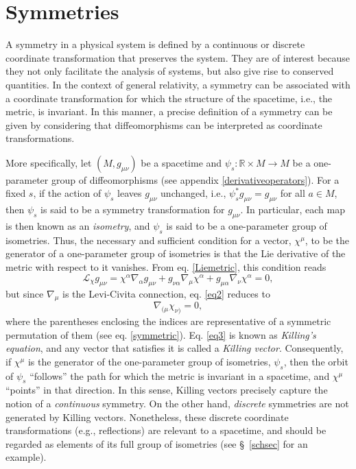 \documentclass[
12pt,		%
openright,	%
twoside,  %
a4paper,			%
chapter=TITLE,		%
english,			%
french,				%
spanish,			%
brazil				%
]{USPSC-classe/USPSC}
\begin{document}
\section{Symmetries}\label{symmetry}

A symmetry in a physical system is defined by a continuous or discrete coordinate transformation that preserves the system. They are of interest because they not only facilitate the analysis of systems, but also give rise to conserved quantities. In the context of general relativity, a symmetry can be associated with a coordinate transformation for which the structure of the spacetime, i.e., the metric, is invariant. In this manner, a precise definition of a symmetry can be given by considering that diffeomorphisms can be interpreted as coordinate transformations.

More specifically, let $(M,g_{\mu\nu})$ be a spacetime and $\psi_s:\mathbb{R}\times M\to M$ be a one-parameter group of diffeomorphisms (see appendix \ref{derivativeoperators}). For a fixed $s$, if the action of $\psi_s$ leaves $g_{\mu\nu}$ unchanged, i.e., $\psi^*_s g_{\mu\nu}=g_{\mu\nu}$ for all $a\in M$, then $\psi_s$ is said to be a symmetry transformation for $g_{\mu\nu}$. In particular, each map is then known as an \textit{isometry}, and $\psi_s$ is said to be a one-parameter group of isometries. Thus, the necessary and sufficient condition for a vector, $\chi^{\mu}$, to be the generator of a one-parameter group of isometries is that the Lie derivative of the metric with respect to it vanishes. From eq. \ref{Liemetric}, this condition reads
\begin{equation}\label{eq2}
    \mathcal{L}_{\chi}g_{\mu\nu}=\chi^{\alpha}\nabla_{\alpha}g_{\mu\nu}+g_{\nu\alpha}\nabla_{\mu}\chi^{\alpha}+g_{\mu\alpha}\nabla_{\nu}\chi^{\alpha}=0,
\end{equation}
but since $\nabla_{\mu}$ is the Levi-Civita connection, eq. \ref{eq2} reduces to 
\begin{equation}\label{eq3}
    \nabla_{(\mu}\chi_{\nu)}=0,
\end{equation}
where the parentheses enclosing the indices are representative of a symmetric permutation of them (see eq. \ref{symmetric}). Eq. \ref{eq3} is known as \textit{Killing's equation}, and any vector that satisfies it is called a \textit{Killing vector}. Consequently, if $\chi^{\mu}$ is the generator of the one-parameter group of isometries, $\psi_s$, then the orbit of $\psi_s$ “follows” the path for which the metric is invariant in a spacetime, and $\chi^{\mu}$ “points” in that direction. In this sense, Killing vectors precisely capture the notion of a \textit{continuous} symmetry. On the other hand, \textit{discrete} symmetries are not generated by Killing vectors. Nonetheless, these discrete coordinate transformations (e.g., reflections) are relevant to a spacetime, and should be regarded as elements of its full group of isometries (see \S~\ref{schsec} for an example).  
\end{document}
